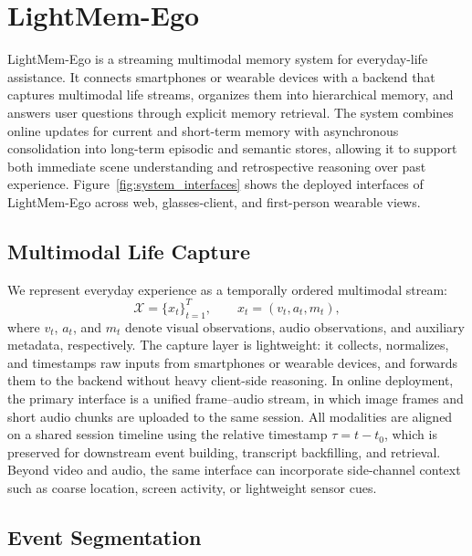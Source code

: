 \section{LightMem-Ego}

LightMem-Ego is a streaming multimodal memory system for everyday-life assistance. 
It connects smartphones or wearable devices with a backend that captures multimodal life streams, organizes them into hierarchical memory, and answers user questions through explicit memory retrieval.
The system combines online updates for current and short-term memory with asynchronous consolidation into long-term episodic and semantic stores, allowing it to support both immediate scene understanding and retrospective reasoning over past experience.
Figure~\ref{fig:system_interfaces} shows the deployed interfaces of 
LightMem-Ego across web, glasses-client, and first-person wearable views.

\subsection{Multimodal Life Capture}

We represent everyday experience as a temporally ordered multimodal stream:
\begin{equation}
\mathcal{X}=\{x_t\}_{t=1}^{T}, \qquad x_t=(v_t,a_t,m_t),
\end{equation}
where \(v_t\), \(a_t\), and \(m_t\) denote visual observations, audio observations, and auxiliary metadata, respectively. 
The capture layer is lightweight: it collects, normalizes, and timestamps raw inputs from smartphones or wearable devices, and forwards them to the backend without heavy client-side reasoning. 
In online deployment, the primary interface is a unified frame--audio stream, in which image frames and short audio chunks are uploaded to the same session. 
All modalities are aligned on a shared session timeline using the relative timestamp \(\tau=t-t_0\), which is preserved for downstream event building, transcript backfilling, and retrieval. 
Beyond video and audio, the same interface can incorporate side-channel context such as coarse location, screen activity, or lightweight sensor cues.

\subsection{Event Segmentation}

